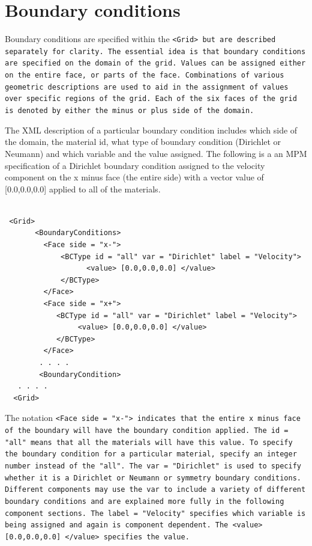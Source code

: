 \section{Boundary conditions}\label{sec:ucf_bc}

Boundary conditions are specified within the \tt <Grid> \normalfont
but are described separately for clarity.  The essential idea is that
boundary conditions are specified on the domain of the grid.  Values
can be assigned either on the entire face, or parts of the face.
Combinations of various geometric descriptions are used to aid in the
assignment of values over specific regions of the grid.  Each of the
six faces of the grid is denoted by either the minus or plus side of
the domain.

The XML description of a particular boundary condition includes which
side of the domain, the material id, what type of boundary condition
(Dirichlet or Neumann) and which variable and the value assigned.  The
following is a an MPM specification of a Dirichlet boundary condition
assigned to the velocity component on the x minus face (the entire
side) with a vector value of [0.0,0.0,0.0] applied to all of the materials.

\begin{Verbatim}[fontsize=\footnotesize]

 <Grid>
       <BoundaryConditions>
         <Face side = "x-">
             <BCType id = "all" var = "Dirichlet" label = "Velocity">
                   <value> [0.0,0.0,0.0] </value>
             </BCType>
         </Face>
         <Face side = "x+">
            <BCType id = "all" var = "Dirichlet" label = "Velocity">
                 <value> [0.0,0.0,0.0] </value>
            </BCType>
         </Face>
        . . . .
        <BoundaryCondition>
   . . . .
  <Grid>

\end{Verbatim}

The notation \tt <Face side = "x-"> \normalfont indicates that the
entire x minus face of the boundary will have the boundary condition
applied.  The \tt id = "all" \normalfont means that all the
materials will have this value.  To specify the boundary condition for
a particular material, specify an integer number instead of the
"all".  The \tt var = "Dirichlet" \normalfont is used to specify
whether it is a Dirichlet or Neumann or symmetry boundary conditions.
Different components may use the \tt var \normalfont to include a
variety of different boundary conditions and are explained more fully
in the following component sections.  The \tt label = "Velocity"
\normalfont specifies which variable is being assigned and again is
component dependent.  The \tt <value> [0.0,0.0,0.0] </value>
\normalfont specifies the value.

